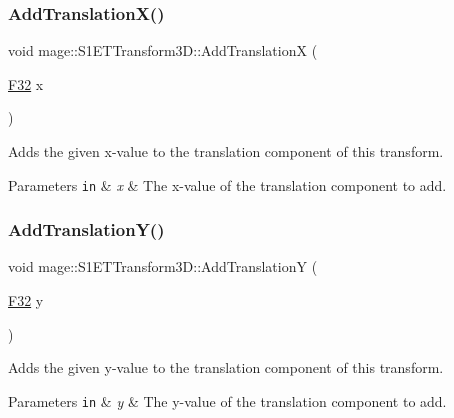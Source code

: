 \subsubsection{\texorpdfstring{Add\+Translation\+X()}{AddTranslationX()}}
{\footnotesize\ttfamily void mage\+::\+S1\+E\+T\+Transform3\+D\+::\+Add\+TranslationX (\begin{DoxyParamCaption}\item[{\mbox{\hyperlink{namespacemage_aa97e833b45f06d60a0a9c4fc22ae02c0}{F32}}}]{x }\end{DoxyParamCaption})\hspace{0.3cm}{\ttfamily [noexcept]}}

Adds the given x-\/value to the translation component of this transform.


\begin{DoxyParams}[1]{Parameters}
\mbox{\tt in}  & {\em x} & The x-\/value of the translation component to add. \\
\hline
\end{DoxyParams}
\mbox{\label{classmage_1_1_s1_e_t_transform3_d_a878f5144f0e4a58b3c674273d6415f4c}} 
\subsubsection{\texorpdfstring{Add\+Translation\+Y()}{AddTranslationY()}}
{\footnotesize\ttfamily void mage\+::\+S1\+E\+T\+Transform3\+D\+::\+Add\+TranslationY (\begin{DoxyParamCaption}\item[{\mbox{\hyperlink{namespacemage_aa97e833b45f06d60a0a9c4fc22ae02c0}{F32}}}]{y }\end{DoxyParamCaption})\hspace{0.3cm}{\ttfamily [noexcept]}}

Adds the given y-\/value to the translation component of this transform.


\begin{DoxyParams}[1]{Parameters}
\mbox{\tt in}  & {\em y} & The y-\/value of the translation component to add. \\
\hline
\end{DoxyParams}
\mbox{\label{classmage_1_1_s1_e_t_transform3_d_a92bb20d95836bdcdaa56c5e829e4baa5}} 
